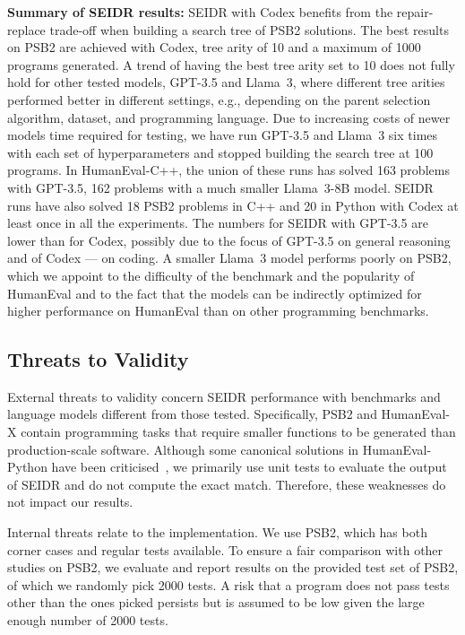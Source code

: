 \begin{highlight}
\textbf{Summary of SEIDR results:} 
SEIDR with Codex benefits from the repair-replace trade-off when building a search tree of PSB2 solutions. The best results on PSB2 are achieved with Codex, tree arity of 10 and a maximum of 1000 programs generated. A trend of having the best tree arity set to 10 does not fully hold for other tested models, GPT-3.5 and Llama~3, where different tree arities performed better in different settings, e.g., depending on the parent selection algorithm, dataset, and programming language. 
Due to increasing costs of newer models time required for testing, we have run GPT-3.5 and Llama~3 six times with each set of hyperparameters and stopped building the search tree at 100 programs. 
In HumanEval-C++, the union of these runs has solved 163 problems with GPT-3.5, 162 problems with a much smaller Llama~3-8B model.
SEIDR runs have also solved 18 PSB2 problems in C++ and 20 in Python with Codex at least once in all the experiments. 
The numbers for SEIDR with GPT-3.5 are lower than for Codex, possibly due to the focus of GPT-3.5 on general reasoning and of Codex --- on coding.
A smaller Llama~3 model performs poorly on PSB2, which we appoint to the difficulty of the benchmark and the popularity of HumanEval and to the fact that the models can be indirectly optimized for higher performance on HumanEval than on other programming benchmarks.
\end{highlight}


\newpage\subsection{Threats to Validity}
\label{sec:seidr-threats}

External threats to validity concern SEIDR performance with benchmarks and language models different from those tested. 
Specifically, PSB2 and HumanEval-X contain programming tasks that require smaller functions to be generated than production-scale software.
Although some canonical solutions in HumanEval-Python have been criticised~\cite{liuYourCodeGenerated2023}, we primarily use unit tests to evaluate the output of SEIDR and do not compute the exact match. Therefore, these weaknesses do not impact our results.

Internal threats relate to the implementation.
We use PSB2, which has both corner cases and regular tests available. 
To ensure a fair comparison with other studies on PSB2, we evaluate and report results on the provided test set of PSB2, of which we randomly pick 2000 tests. 
A risk that a program does not pass tests other than the ones picked persists but is assumed to be low given the large enough number of 2000 tests. 

